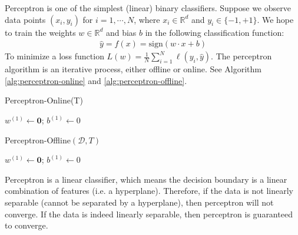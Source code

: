 \documentclass[12pt]{article}
\theoremstyle{definition}
\begin{document}
Perceptron is one of the simplest (linear) binary classifiers. Suppose we observe data points $(x_i, y_i)$ for $i=1,\cdots,N$, where $x_i\in\mathbb{R}^d$ and $y_i\in\{-1,+1\}$. We hope to train the weights $w\in\mathbb{R}^d$ and bias $b$ in the following classification function:
\begin{align}
\hat{y}=f(x)=\text{sign}(w\cdot x+b)
\end{align}
To minimize a loss function $L(w) = \frac{1}{N}\sum_{i=1}^N\ell(y_i, \hat{y})$. The perceptron algorithm is an iterative process, either offline or online. See Algorithm \ref{alg:perceptron-online} and \ref{alg:perceptron-offline}.


\begin{algorithm}[h]
    \caption{Perceptron-Online(T)}
    \label{alg:perceptron-online}
    $w^{(1)}\gets \bm{0}$; $b^{(1)}\gets 0$\;
\end{algorithm}

\begin{algorithm}[h]
    \caption{Perceptron-Offline$(\mathcal{D},T)$}
    \label{alg:perceptron-offline}
    $w^{(1)}\gets \bm{0}$; $b^{(1)}\gets 0$\;
\end{algorithm}

Perceptron is a linear classifier, which means the decision boundary is a linear combination of features (i.e. a hyperplane). Therefore, if the data is not linearly separable (cannot be separated by a hyperplane), then perceptron will not converge. If the data is indeed linearly separable, then perceptron is guaranteed to converge.
\end{document}
